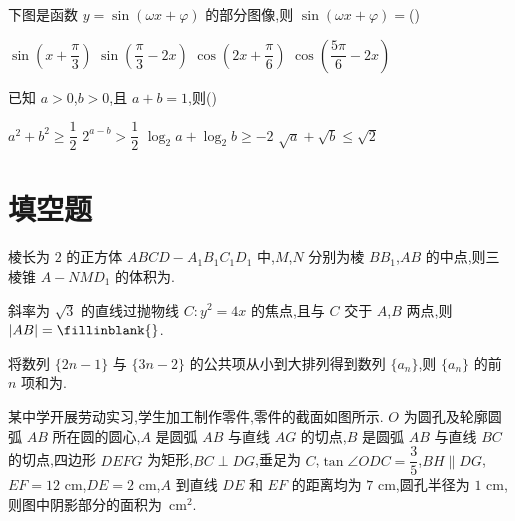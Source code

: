 \begin{problem}
下图是函数 \(y=\sin(\omega x+\varphi)\) 的部分图像,则 \(\sin(\omega x+\varphi)=\)(\quad)

\begin{center}
\end{center}

\choices
    {\(\sin\left(x+\dfrac{\pi}{3}\right)\)}
    {\(\sin\left(\dfrac{\pi}{3}-2x\right)\)}
    {\(\cos\left(2x+\dfrac{\pi}{6}\right)\)}
    {\(\cos\left(\dfrac{5\pi}{6}-2x\right)\)}
\end{problem}

\begin{problem}
已知 \(a>0\),\(b>0\),且 \(a+b=1\),则(\quad)

\choices
    {\(a^2+b^2\geqslant\dfrac12\)}
    {\(2^{a-b}>\dfrac12\)}
    {\(\log_2a+\log_2b\geqslant-2\)}
    {\(\sqrt a+\sqrt b\leqslant\sqrt2\)}
\end{problem}

\section{填空题}

\begin{problem}
棱长为 \(2\) 的正方体 \(ABCD-A_1B_1C_1D_1\) 中,\(M\),\(N\) 分别为棱 \(BB_1\),\(AB\) 的中点,则三棱锥 \(A-NMD_1\) 的体积为\fillinblank{}.
\end{problem}

\begin{problem}
斜率为 \(\sqrt3\) 的直线过抛物线 \(C:y^2=4x\) 的焦点,且与 \(C\) 交于 \(A\),\(B\) 两点,则 \(|AB|=\fillinblank{}\).
\end{problem}

\begin{problem}
将数列 \(\{2n-1\}\) 与 \(\{3n-2\}\) 的公共项从小到大排列得到数列 \(\{a_n\}\),则 \(\{a_n\}\) 的前 \(n\) 项和为\fillinblank{}.
\end{problem}

\begin{problem}
某中学开展劳动实习,学生加工制作零件,零件的截面如图所示. \(O\) 为圆孔及轮廓圆弧 \(AB\) 所在圆的圆心,\(A\) 是圆弧 \(AB\) 与直线 \(AG\) 的切点,\(B\) 是圆弧 \(AB\) 与直线 \(BC\) 的切点,四边形 \(DEFG\) 为矩形,\(BC\perp DG\),垂足为 \(C\),\(\tan\angle ODC=\dfrac35\),\(BH\parallel DG\),\(EF=12\text{ cm}\),\(DE=2\text{ cm}\),\(A\) 到直线 \(DE\) 和 \(EF\) 的距离均为 \(7\text{ cm}\),圆孔半径为 \(1\text{ cm}\),则图中阴影部分的面积为\fillinblank{}\ \(\text{cm}^2\).

\begin{center}
\end{center}
\end{problem}

